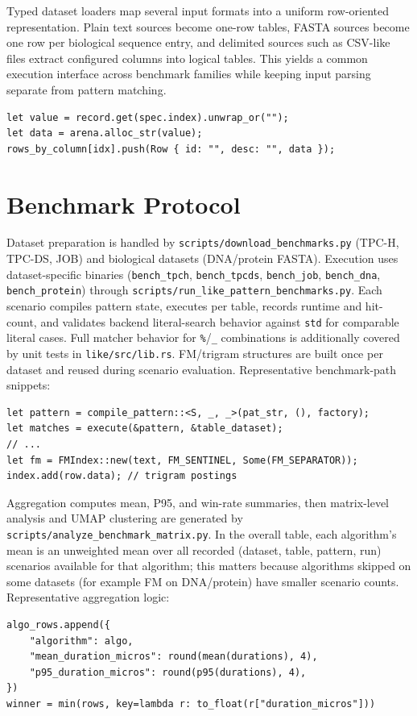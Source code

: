 \documentclass[11pt]{article}
\begin{document}
Typed dataset loaders map several input formats into a uniform row-oriented representation. Plain text sources become one-row tables, FASTA sources become one row per biological sequence entry, and delimited sources such as CSV-like files extract configured columns into logical tables. This yields a common execution interface across benchmark families while keeping input parsing separate from pattern matching.

\begin{lstlisting}[style=ruststyle]
let value = record.get(spec.index).unwrap_or("");
let data = arena.alloc_str(value);
rows_by_column[idx].push(Row { id: "", desc: "", data });
\end{lstlisting}

\section{Benchmark Protocol}
Dataset preparation is handled by \texttt{scripts/download\_benchmarks.py} (TPC-H, TPC-DS, JOB) and biological datasets (DNA/protein FASTA). Execution uses dataset-specific binaries (\texttt{bench\_tpch}, \texttt{bench\_tpcds}, \texttt{bench\_job}, \texttt{bench\_dna}, \texttt{bench\_protein}) through \texttt{scripts/run\_like\_pattern\_benchmarks.py}. Each scenario compiles pattern state, executes per table, records runtime and hit-count, and validates backend literal-search behavior against \texttt{std} for comparable literal cases. Full matcher behavior for \texttt{\%}/\texttt{\_} combinations is additionally covered by unit tests in \texttt{like/src/lib.rs}. FM/trigram structures are built once per dataset and reused during scenario evaluation. Representative benchmark-path snippets:
\begin{lstlisting}[style=ruststyle]
let pattern = compile_pattern::<S, _, _>(pat_str, (), factory);
let matches = execute(&pattern, &table_dataset);
// ...
let fm = FMIndex::new(text, FM_SENTINEL, Some(FM_SEPARATOR));
index.add(row.data); // trigram postings
\end{lstlisting}

Aggregation computes mean, P95, and win-rate summaries, then matrix-level analysis and UMAP clustering are generated by \texttt{scripts/analyze\_benchmark\_matrix.py}. In the overall table, each algorithm's mean is an unweighted mean over all recorded (dataset, table, pattern, run) scenarios available for that algorithm; this matters because algorithms skipped on some datasets (for example FM on DNA/protein) have smaller scenario counts. Representative aggregation logic:
\begin{lstlisting}[style=ruststyle]
algo_rows.append({
    "algorithm": algo,
    "mean_duration_micros": round(mean(durations), 4),
    "p95_duration_micros": round(p95(durations), 4),
})
winner = min(rows, key=lambda r: to_float(r["duration_micros"]))
\end{lstlisting}
\end{document}
